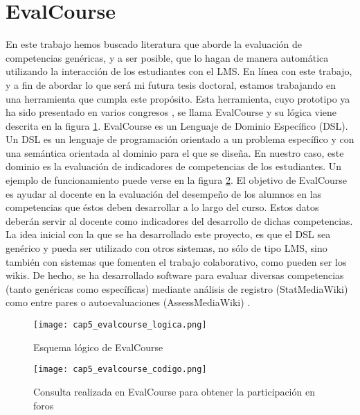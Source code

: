\section{EvalCourse}
En este trabajo hemos buscado literatura que aborde la evaluación de competencias genéricas, y a ser posible, que lo hagan de manera automática utilizando la interacción de los estudiantes con el LMS. En línea con este trabajo, y a fin de abordar lo que será mi futura tesis doctoral, estamos trabajando en una herramienta que cumpla este propósito. Esta herramienta, cuyo prototipo ya ha sido presentado en varios congresos \cite{Balderas:2013,Balderas:2013a}, se llama EvalCourse y su lógica viene descrita en la figura \ref{fig:EvalcourseLogica}. EvalCourse es un Lenguaje de Dominio Específico (DSL). Un DSL es un lenguaje de programación orientado a un problema específico y con una semántica orientada al dominio para el que se diseña. En nuestro caso, este dominio es la evaluación de indicadores de competencias de los estudiantes. Un ejemplo de funcionamiento puede verse en la figura \ref{fig:EvalCourseCodigo}. El objetivo de EvalCourse es ayudar al docente en la evaluación del desempeño de los alumnos en las competencias que éstos deben desarrollar a lo largo del curso. Estos datos deberán servir al docente como indicadores del desarrollo de dichas competencias. La idea inicial con la que se ha desarrollado este proyecto, es que el DSL sea genérico y pueda ser utilizado con otros sistemas, no sólo de tipo LMS, sino también con sistemas que fomenten el trabajo colaborativo, como pueden ser los wikis. De hecho, se ha desarrollado software para evaluar diversas competencias (tanto genéricas como específicas) mediante análisis de registro (StatMediaWiki) como entre pares o autoevaluaciones (AssessMediaWiki) \cite{Palomo-Duarte:2013}.



\begin{figure}[H]
  \begin{center}
    \texttt{[image: cap5\_evalcourse\_logica.png]}
  \end{center}
  \caption{Esquema lógico de EvalCourse}
  \label{fig:EvalcourseLogica}
\end{figure}


\begin{figure}[H]
  \begin{center}
    \texttt{[image: cap5\_evalcourse\_codigo.png]}
  \end{center}
  \caption{Consulta realizada en EvalCourse para obtener la participación en foros}
  \label{fig:EvalCourseCodigo}
\end{figure}

